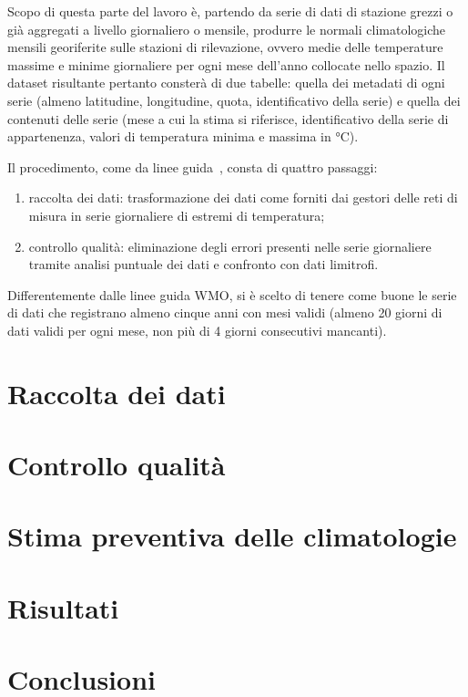 
Scopo di questa parte del lavoro è, partendo da serie di dati di stazione grezzi o già aggregati a livello giornaliero o mensile, produrre le normali climatologiche mensili georiferite sulle stazioni di rilevazione, ovvero medie delle temperature massime e minime giornaliere per ogni mese dell'anno collocate nello spazio. Il dataset risultante pertanto consterà di due tabelle: quella dei metadati di ogni serie (almeno latitudine, longitudine, quota, identificativo della serie) e quella dei contenuti delle serie (mese a cui la stima si riferisce, identificativo della serie di appartenenza, valori di temperatura minima e massima in \(\unit{\degreeCelsius}\)).

Il procedimento, come da linee guida~\cite{WMOGuidelinesNormalsCalculation2017}, consta di quattro passaggi:

\begin{enumerate}
  \item raccolta dei dati: trasformazione dei dati come forniti dai gestori
    delle reti di misura in serie giornaliere di estremi di temperatura;
  \item controllo qualità: eliminazione degli errori presenti nelle serie
    giornaliere tramite analisi puntuale dei dati e confronto con dati
    limitrofi.
\end{enumerate}

Differentemente dalle linee guida WMO, si è scelto di tenere come buone le serie di dati che registrano almeno cinque anni con mesi validi (almeno 20 giorni di dati validi per ogni mese, non più di 4 giorni consecutivi mancanti).

\section{Raccolta dei dati}\label{ch:raccolta-dati}


\section{Controllo qualità}\label{ch:qc}


\section{Stima preventiva delle climatologie}\label{ch:clino}


\section{Risultati}\label{ch:risultati}


\section{Conclusioni}\label{ch:conclusioni}